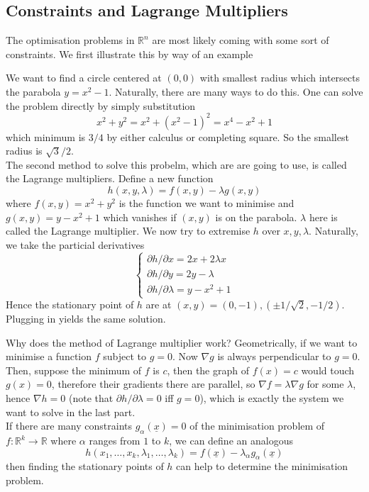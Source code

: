 \subsection{Constraints and Lagrange Multipliers}
The optimisation problems in $\mathbb R^n$ are most likely coming with some sort of constraints.
We first illustrate this by way of an example
\begin{example}
    We want to find a circle centered at $(0,0)$ with smallest radius which intersects the parabola $y=x^2-1$.
    Naturally, there are many ways to do this.
    One can solve the problem directly by simply substitution
    $$x^2+y^2=x^2+(x^2-1)^2=x^4-x^2+1$$
    which minimum is $3/4$ by either calculus or completing square.
    So the smallest radius is $\sqrt{3}/2$.\\
    The second method to solve this probelm, which are are going to use, is called the Lagrange multipliers.
    Define a new function
    $$h(x,y,\lambda)=f(x,y)-\lambda g(x,y)$$
    where $f(x,y)=x^2+y^2$ is the function we want to minimise and $g(x,y)=y-x^2+1$ which vanishes if $(x,y)$ is on the parabola.
    $\lambda$ here is called the Lagrange multiplier.
    We now try to extremise $h$ over $x,y,\lambda$.
    Naturally, we take the particial derivatives
    $$\begin{cases}
        \partial h/\partial x=2x+2\lambda x\\
        \partial h/\partial y=2y-\lambda\\
        \partial h/\partial\lambda=y-x^2+1
    \end{cases}$$
    Hence the stationary point of $h$ are at $(x,y)=(0,-1),(\pm 1/\sqrt{2},-1/2)$.
    Plugging in yields the same solution.
\end{example}
Why does the method of Lagrange multiplier work?
Geometrically, if we want to minimise a function $f$ subject to $g=0$.
Now $\nabla g$ is always perpendicular to $g=0$.
Then, suppose the minimum of $f$ is $c$, then the graph of $f(x)=c$ would touch $g(x)=0$, therefore their gradients there are parallel, so $\nabla f=\lambda\nabla g$ for some $\lambda$, hence $\nabla h=0$ (note that $\partial h/\partial\lambda=0$ iff $g=0$), which is exactly the system we want to solve in the last part.\\
If there are many constraints $g_\alpha(\underline{x})=0$ of the minimisation problem of $f:\mathbb R^k\to\mathbb R$ where $\alpha$ ranges from $1$ to $k$, we can define an analogous
$$h(x_1,\ldots,x_k,\lambda_1,\ldots,\lambda_k)=f(\underline{x})-\lambda_\alpha g_\alpha(\underline{x})$$
then finding the stationary points of $h$ can help to determine the minimisation problem.